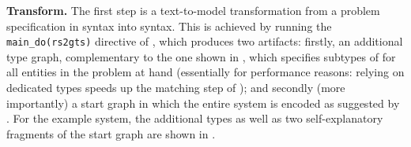 \medskip\noindent\textbf{Transform.}
%
The first step is a text-to-model transformation from a problem specification in \BioResolve syntax into \GROOVE syntax. This is achieved by running the \verb=main_do(rs2gts)= directive of \BioResolve, which produces two artifacts: firstly, an additional type graph, complementary to the one shown in , which specifies subtypes of \Entity for all entities in the problem at hand (essentially for performance reasons: relying on dedicated types speeds up the matching step of \GROOVE); and secondly (more importantly) a start graph in which the entire \BioResolve system is encoded as suggested by . For the example system, the additional types as well as two self-explanatory fragments of the start graph are shown in .

\begin{figure}
\centering
{}

\end{figure}
